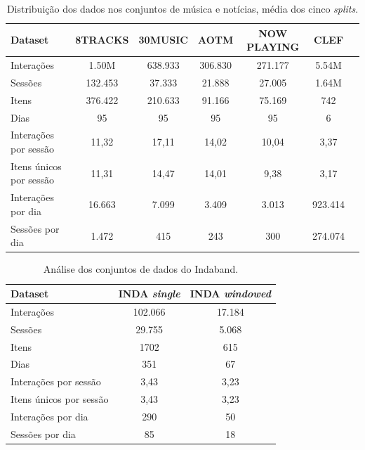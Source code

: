   \begin{table}
    \centering
    \begin{tabular}{lcccccc}
        \toprule
        \textbf{Dataset} & \textbf{8TRACKS} & \textbf{30MUSIC} & \textbf{AOTM} & \textbf{NOW PLAYING} & \textbf{CLEF} \\
        \midrule
        Interações & 1.50M & 638.933 & 306.830 & 271.177 & 5.54M \\
        Sessões & 132.453 & 37.333 & 21.888 & 27.005 & 1.64M \\
        Itens & 376.422 & 210.633 & 91.166 & 75.169 & 742 \\
        Dias & 95 & 95 & 95 & 95 & 6 \\
        \hline
        Interações por sessão & 11,32 & 17,11 & 14,02 & 10,04 & 3,37 \\
        Itens únicos por sessão & 11,31 & 14,47 & 14,01 & 9,38 & 3,17 \\
        Interações por dia & 16.663 & 7.099 & 3.409 & 3.013 & 923.414 \\
        Sessões por dia & 1.472 & 415 & 243 & 300 & 274.074 \\
        \bottomrule
    \end{tabular}
    \caption{Distribuição dos dados nos conjuntos de música e notícias, média dos cinco \textit{splits}.}
    \label{tab:datasets_comparison}
  \end{table}
  
  \begin{table}
    \centering
    \begin{tabular}{lcc}
        \toprule
        \textbf{Dataset} & \textbf{INDA \textit{single}} & \textbf{INDA \textit{windowed}}\\
        \midrule
        Interações & 102.066 & 17.184  \\
        Sessões & 29.755 & 5.068  \\
        Itens & 1702 & 615  \\
        Dias & 351 & 67  \\
        \hline
        Interações por sessão & 3,43 & 3,23 \\
        Itens únicos por sessão & 3,43 & 3,23 \\
        Interações por dia & 290 & 50 \\
        Sessões por dia & 85 & 18 \\
        \bottomrule
    \end{tabular}
    \caption{Análise dos conjuntos de dados do Indaband.}
    \label{tab:datasets_including_inda}
  \end{table}
  
